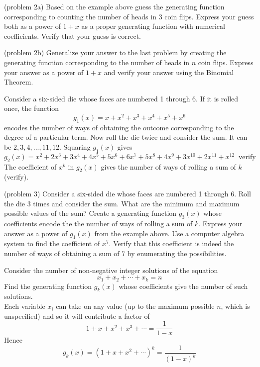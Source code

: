 \documentclass[handout]{ximera}
\begin{document}
\begin{problem}(problem 2a)
Based on the example above guess the generating function corresponding to counting the number of heads in 3 coin flips.
Express your guess both as a power of $1+x$ as a proper generating function with numerical coefficients.
Verify that your guess is correct. 
\end{problem}

\begin{problem}(problem 2b)
Generalize your answer to the last problem by creating the generating function corresponding to the 
number of heads in $n$ coin flips.
Express your answer as a power of $1+x$ and verify your answer using the Binomial Theorem.
\end{problem}
 

\begin{example}[example 3]
Consider a six-sided die whose faces are numbered 1 through 6. If it is rolled once, the function
\[
g_1(x) = x + x^2 + x^3 + x^4 + x^5 + x^6
\]
encodes the number of ways of obtaining the outcome corresponding to the degree of a particular term.
Now roll the die twice and consider the sum. It can be $2, 3, 4, ..., 11, 12$. Squaring $g_1(x)$ gives
\[
g_2(x) = x^2 + 2x^3 + 3x^4 + 4x^5 + 5x^6 + 6x^7 + 5x^8 + 4x^9+ 3x^{10} + 2x^{11} + x^{12} \;\; \text{verify}
\]
The coefficient of $x^k$ in $g_2(x)$ gives the number of ways of rolling a sum of $k$ (verify).
\end{example}

\begin{problem}(problem 3)
Consider a six-sided die whose faces are numbered 1 through 6. Roll the die 3 times and consider the sum.
What are the minimum and maximum possible values of the sum? Create a generating function $g_3(x)$ whose coefficients 
encode the the number of ways of rolling a sum of $k$.  Express your answer as a power of $g_1(x)$ from the example above.
Use a computer algebra system to find the coefficient of $x^7$. Verify that this coefficient is 
indeed the number of ways of obtaining a sum of $7$ by enumerating the possibilities.
\end{problem}


\begin{example}[example 4]
Consider the number of non-negative integer solutions of the equation
\[
x_1 + x_2 + \cdots + x_k = n
\]
Find the generating function $g_k(x)$ whose coefficients give the number of such solutions.\\
Each variable $x_i$ can take on any value (up to the maximum possible $n$, which is unspecified) and so it will contribute 
a factor of 
\[
1 + x + x^2 +x^3 + \cdots = \frac{1}{1-x}
\]
Hence
\[
g_k(x) = (1+x+x^2 + \cdots)^k = \frac{1}{(1-x)^k}
\]
\end{example}
\end{document}
